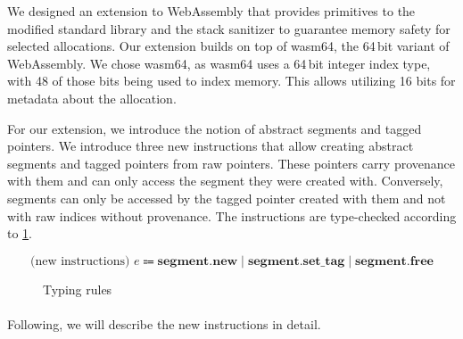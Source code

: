 We designed an extension to WebAssembly that provides primitives to the modified standard library and the stack sanitizer to guarantee memory safety for selected allocations.
Our extension builds on top of wasm64, the 64\,bit variant of WebAssembly.
We chose wasm64, as wasm64 uses a 64\,bit integer index type, with 48 of those bits being used to index memory.
This allows utilizing 16 bits for metadata about the allocation.

For our extension, we introduce the notion of abstract segments and tagged pointers.
We introduce three new instructions that allow creating abstract segments and tagged pointers from raw pointers.
These pointers carry provenance with them and can only access the segment they were created with.
Conversely, segments can only be accessed by the tagged pointer created with them and not with raw indices without provenance.
The instructions are type-checked according to \cref{fig:typing-rules}.

\begin{equation*}
    \text{(new instructions) } e \Coloneqq \textbf{segment.new} \mid \textbf{segment.set\_tag} \mid \textbf{segment.free}
\end{equation*}


\begin{figure}[t]
    \begin{prooftree}
    \end{prooftree}
    \begin{prooftree}
    \end{prooftree}
    \begin{prooftree}
    \end{prooftree}
    \caption{Typing rules}
    \label{fig:typing-rules}
\end{figure}

\paragraph{}
Following, we will describe the new instructions in detail.

